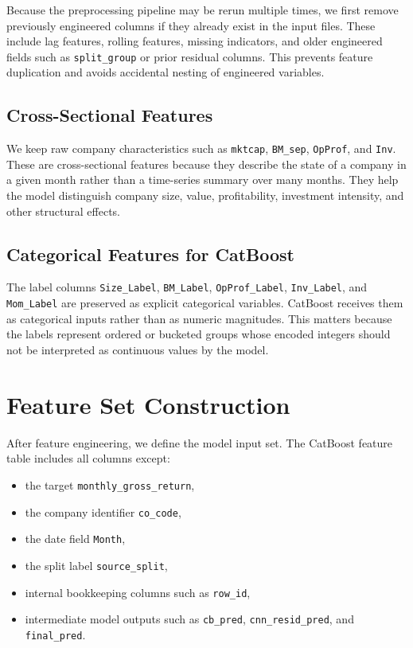 \documentclass[11pt]{article}
\begin{document}
Because the preprocessing pipeline may be rerun multiple times, we first remove previously engineered columns if they already exist in the input files. These include lag features, rolling features, missing indicators, and older engineered fields such as \texttt{split\_group} or prior residual columns. This prevents feature duplication and avoids accidental nesting of engineered variables.

\subsection{Cross-Sectional Features}

We keep raw company characteristics such as \texttt{mktcap}, \texttt{BM\_sep}, \texttt{OpProf}, and \texttt{Inv}. These are cross-sectional features because they describe the state of a company in a given month rather than a time-series summary over many months. They help the model distinguish company size, value, profitability, investment intensity, and other structural effects.

\subsection{Categorical Features for CatBoost}

The label columns \texttt{Size\_Label}, \texttt{BM\_Label}, \texttt{OpProf\_Label}, \texttt{Inv\_Label}, and \texttt{Mom\_Label} are preserved as explicit categorical variables. CatBoost receives them as categorical inputs rather than as numeric magnitudes. This matters because the labels represent ordered or bucketed groups whose encoded integers should not be interpreted as continuous values by the model.

\section{Feature Set Construction}

After feature engineering, we define the model input set. The CatBoost feature table includes all columns except:
\begin{itemize}
    \item the target \texttt{monthly\_gross\_return},
    \item the company identifier \texttt{co\_code},
    \item the date field \texttt{Month},
    \item the split label \texttt{source\_split},
    \item internal bookkeeping columns such as \texttt{row\_id},
    \item intermediate model outputs such as \texttt{cb\_pred}, \texttt{cnn\_resid\_pred}, and \texttt{final\_pred}.
\end{itemize}
\end{document}
